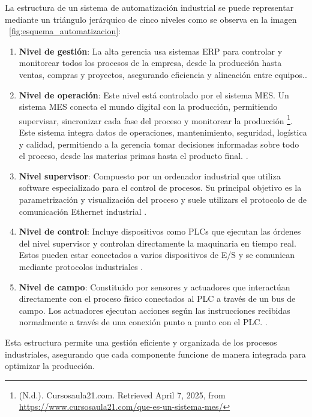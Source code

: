 La estructura de un sistema de automatización industrial se puede representar mediante un triángulo jerárquico de cinco niveles como se observa en la imagen ~\ref{fig:esquema_automatizacion}:

\begin{enumerate}
    \item \textbf{Nivel de gestión}: La alta gerencia usa sistemas ERP para controlar y monitorear todos los procesos de la empresa, desde la producción hasta ventas, compras y proyectos, asegurando eficiencia y alineación entre equipos.\cite{niveles_automatizacion_2}.
    \item \textbf{Nivel de operación}: Este nivel está controlado por el sistema MES. Un sistema MES conecta el mundo digital con la producción, permitiendo supervisar, sincronizar cada fase del proceso y monitorear la producción \footnote{  (N.d.). Cursosaula21.com. Retrieved April 7, 2025, from \url{ https://www.cursosaula21.com/que-es-un-sistema-mes/}}. Este sistema integra datos de operaciones, mantenimiento, seguridad, logística y calidad, permitiendo a la gerencia tomar decisiones informadas sobre todo el proceso, desde las materias primas hasta el producto final. \cite{niveles_automatizacion_2}.
    \item \textbf{Nivel supervisor}: Compuesto por un ordenador industrial que utiliza software especializado para el control de procesos. Su principal objetivo es la parametrización y visualización del proceso y suele utilizars el protocolo de de comunicación Ethernet industrial \cite{niveles_automatizacion_1}.
    \item \textbf{Nivel de control}: Incluye dispositivos como PLCs que ejecutan las órdenes del nivel supervisor y controlan directamente la maquinaria en tiempo real. Estos pueden estar conectados a varios dispositivos de E/S y se comunican mediante protocolos industriales \cite{niveles_automatizacion_1}.
    \item \textbf{Nivel de campo}: Constituido por sensores y actuadores que interactúan directamente con el proceso físico conectados al PLC a través de un bus de campo. Los actuadores ejecutan acciones según las instrucciones recibidas normalmente a través de una conexión punto a punto con el PLC. \cite{niveles_automatizacion_1}. 
\end{enumerate}

Esta estructura permite una gestión eficiente y organizada de los procesos industriales, asegurando que cada componente funcione de manera integrada para optimizar la producción. 

